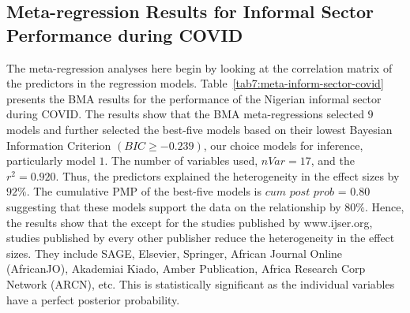 \documentclass[a4paper, 12pt]{article}
\begin{document}
    \subsection{Meta-regression Results for Informal Sector Performance during COVID}\label{subsec:meta-regression-results-informal-sector-performance-during-covid}
    The meta-regression analyses here begin by looking at the correlation matrix of the predictors in the regression models. Table~\ref{tab7:meta-inform-sector-covid} presents the BMA results for the performance of the Nigerian informal sector during COVID. The results show that the BMA meta-regressions selected $9$ models and further selected the best-five models based on their lowest Bayesian Information Criterion $(BIC \geq -0.239)$, our choice models for inference, particularly model $1$. The number of variables used, $nVar = 17$, and the $r^2 = 0.920$. Thus, the predictors explained the heterogeneity in the effect sizes by $92\%$. The cumulative PMP of the best-five models is $cum$ $post$ $prob$ = $0.80$ suggesting that these models support the data on the relationship by $80\%$. Hence, the results show that the except for the studies published by www.ijser.org, studies published by every other publisher reduce the heterogeneity in the effect sizes. They include SAGE, Elsevier, Springer, African Journal Online (AfricanJO), Akademiai Kiado, Amber Publication, Africa Research Corp Network (ARCN), etc. This is statistically significant as the individual variables have a perfect posterior probability.
\end{document}
